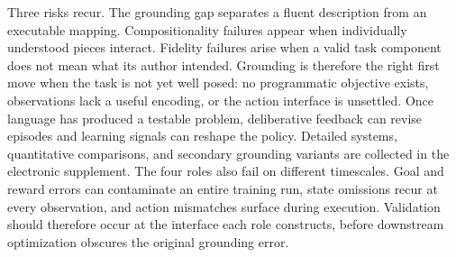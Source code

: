 Three risks recur. The grounding gap separates a fluent description from an executable mapping. Compositionality failures appear when individually understood pieces interact. Fidelity failures arise when a valid task component does not mean what its author intended. Grounding is therefore the right first move when the task is not yet well posed: no programmatic objective exists, observations lack a useful encoding, or the action interface is unsettled. Once language has produced a testable problem, deliberative feedback can revise episodes and learning signals can reshape the policy. Detailed systems, quantitative comparisons, and secondary grounding variants are collected in the electronic supplement.
The four roles also fail on different timescales. Goal and reward errors can contaminate an entire training run, state omissions recur at every observation, and action mismatches surface during execution. Validation should therefore occur at the interface each role constructs, before downstream optimization obscures the original grounding error.
